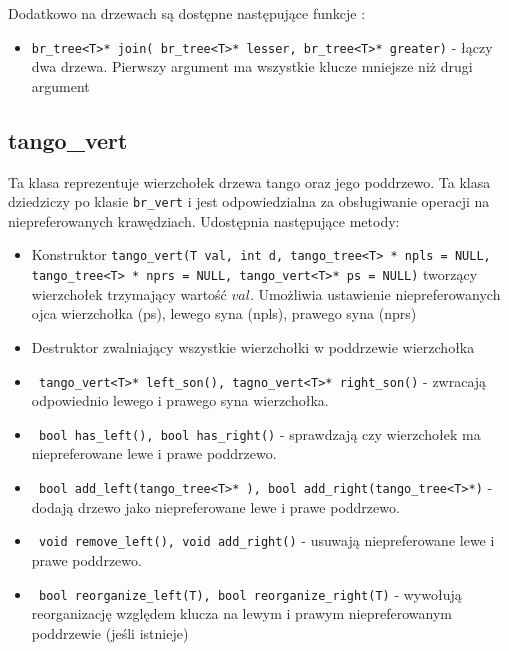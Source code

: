 \documentclass[declaration,shortabstract]{iithesis}
\theoremstyle{thm}
\theoremstyle{remark}
\theoremstyle{plain}
\theoremstyle{plain}
\theoremstyle{plain}
\begin{document}
Dodatkowo na drzewach  są dostępne następujące funkcje : 

\begin{itemize}
\item{\texttt{br\_tree<T>* join( br\_tree<T>* lesser, br\_tree<T>* greater)} - łączy dwa drzewa. Pierwszy argument ma wszystkie klucze mniejsze niż drugi argument}

\end{itemize}



\subsection{tango\_vert}

Ta klasa reprezentuje wierzchołek drzewa tango oraz jego poddrzewo. Ta klasa dziedziczy po klasie \texttt{br\_vert} i jest odpowiedzialna za obsługiwanie operacji na niepreferowanych krawędziach. Udostępnia następujące metody: 

\begin{itemize}

\item{Konstruktor \texttt{tango\_vert(T val, int d, tango\_tree<T> * npls = NULL, tango\_tree<T> * nprs = NULL, tango\_vert<T>* ps = NULL)} tworzący wierzchołek trzymający wartość $val$. Umożliwia ustawienie niepreferowanych ojca wierzchołka (ps), lewego syna (npls), prawego syna (nprs)}

\item{Destruktor zwalniający wszystkie wierzchołki w poddrzewie wierzchołka}

\item{\texttt{  tango\_vert<T>* left\_son(), tagno\_vert<T>* right\_son()} - zwracają odpowiednio lewego i prawego syna wierzchołka. }
    
\item{\texttt{  bool has\_left(), bool has\_right()} - sprawdzają czy wierzchołek ma niepreferowane lewe i prawe poddrzewo. }

\item{\texttt{  bool add\_left(tango\_tree<T>* ), bool add\_right(tango\_tree<T>*)} - dodają drzewo jako niepreferowane lewe i prawe poddrzewo. }

\item{\texttt{  void remove\_left(), void add\_right()} - usuwają niepreferowane lewe i prawe poddrzewo. }


\item{\texttt{ bool reorganize\_left(T), bool reorganize\_right(T)} - wywołują reorganizację względem klucza na lewym i prawym niepreferowanym poddrzewie (jeśli istnieje) }

\end{itemize}
\end{document}
